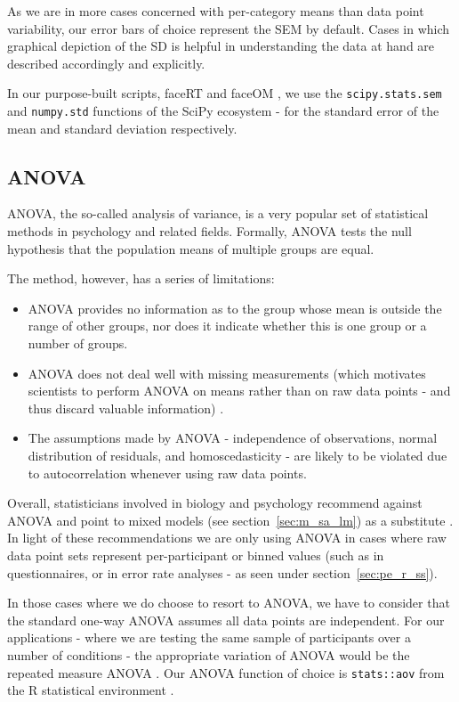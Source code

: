	    As we are in more cases concerned with per-category means than data point variability, our error bars of choice represent the SEM by default.
	    Cases in which graphical depiction of the SD is helpful in understanding the data at hand are described accordingly and explicitly.
	    
	    In our purpose-built scripts, faceRT \citep{faceRT} and faceOM \citep{faceOM}, we use the \colorbox{vlg}{\texttt{scipy.stats.sem}} and \colorbox{vlg}{\texttt{numpy.std}} functions of the SciPy ecosystem \citep{scipy,Oliphant2007} -
	    for the standard error of the mean and standard deviation respectively.
	\subsection{ANOVA}\label{sec:m_sa_a}
	    ANOVA, the so-called analysis of variance, is a very popular set of statistical methods in psychology and related fields.
	    Formally, ANOVA tests the null hypothesis that the population means of multiple groups are equal.
	    
	    The method, however, has a series of limitations:
	    \begin{itemize}
		\item ANOVA provides no information as to the group whose mean is outside the range of other groups, nor does it indicate whether this is one group or a number of groups.
		\item ANOVA does not deal well with missing measurements (which motivates scientists to perform ANOVA on means rather than on raw data points - and thus discard valuable information) \citep{Gueorguieva2004}.
		\item The assumptions made by ANOVA - independence of observations, normal distribution of residuals, and homoscedasticity \citep{Anderson1996} - are likely to be violated due to autocorrelation whenever using raw data points. 
	    \end{itemize}
	    Overall, statisticians involved in biology and psychology recommend against ANOVA and point to mixed models (see section~\ref{sec:m_sa_lm}) as a substitute \citep{Baayen2008,Gueorguieva2004}. 
	    In light of these recommendations we are only using ANOVA in cases where raw data point sets represent per-participant or binned values 
	    (such as in questionnaires, or in error rate analyses - as seen under section~\ref{sec:pe_r_ss}).
	    
	    In those cases where we do choose to resort to ANOVA, we have to consider that the standard one-way ANOVA assumes all data points are independent.
	    For our applications - where we are testing the same sample of participants over a number of conditions - the appropriate variation of ANOVA would be the repeated measure ANOVA \citep{Gueorguieva2004}.
	    Our ANOVA function of choice is \colorbox{vlg}{\texttt{stats::aov}} \citep{Chambers1992} from the R statistical environment \citep{R}.
